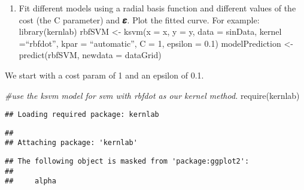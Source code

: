 \documentclass[
]{article}
\newenvironment{Shaded}{\begin{snugshade}}{\end{snugshade}}
\newcommand{\AttributeTok}[1]{\textcolor[rgb]{0.77,0.63,0.00}{#1}}
\newcommand{\CommentTok}[1]{\textcolor[rgb]{0.56,0.35,0.01}{\textit{#1}}}
\newcommand{\DecValTok}[1]{\textcolor[rgb]{0.00,0.00,0.81}{#1}}
\newcommand{\FloatTok}[1]{\textcolor[rgb]{0.00,0.00,0.81}{#1}}
\newcommand{\FunctionTok}[1]{\textcolor[rgb]{0.00,0.00,0.00}{#1}}
\newcommand{\NormalTok}[1]{#1}
\newcommand{\OtherTok}[1]{\textcolor[rgb]{0.56,0.35,0.01}{#1}}
\newcommand{\SpecialCharTok}[1]{\textcolor[rgb]{0.00,0.00,0.00}{#1}}
\newcommand{\StringTok}[1]{\textcolor[rgb]{0.31,0.60,0.02}{#1}}
\providecommand{\tightlist}{%
  \setlength{\itemsep}{0pt}\setlength{\parskip}{0pt}}
\begin{document}
\begin{enumerate}
\def\labelenumi{(\alph{enumi})}
\tightlist
\item
  Fit different models using a radial basis function and different
  values of the cost (the C parameter) and 𝜺. Plot the fitted curve. For
  example: library(kernlab) rbfSVM \textless- ksvm(x = x, y = y, data =
  sinData, kernel =``rbfdot'', kpar = ``automatic'', C = 1, epsilon =
  0.1) modelPrediction \textless- predict(rbfSVM, newdata = dataGrid)
\end{enumerate}

We start with a cost param of 1 and an epsilon of 0.1.

\begin{Shaded}
\begin{Highlighting}[]
\CommentTok{\#use the ksvm model for svm with rbfdot as our kernel method.}
\FunctionTok{require}\NormalTok{(kernlab)}
\end{Highlighting}
\end{Shaded}

\begin{verbatim}
## Loading required package: kernlab
\end{verbatim}

\begin{verbatim}
## 
## Attaching package: 'kernlab'
\end{verbatim}

\begin{verbatim}
## The following object is masked from 'package:ggplot2':
## 
##     alpha
\end{verbatim}

\begin{Shaded}
\end{Shaded}
\end{document}
